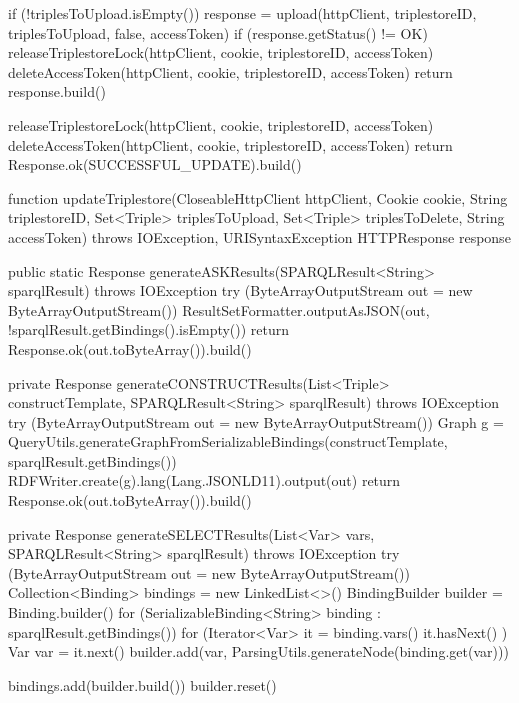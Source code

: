     if (!triplesToUpload.isEmpty()) 
        response = upload(httpClient, triplestoreID, triplesToUpload, false, accessToken)
        if (response.getStatus() != OK) 
            releaseTriplestoreLock(httpClient, cookie, triplestoreID, accessToken)
            deleteAccessToken(httpClient, cookie, triplestoreID, accessToken)
            return response.build()
        
    
    releaseTriplestoreLock(httpClient, cookie, triplestoreID, accessToken)
    deleteAccessToken(httpClient, cookie, triplestoreID, accessToken)
    return Response.ok(SUCCESSFUL_UPDATE).build()


function updateTriplestore(CloseableHttpClient httpClient, Cookie cookie, String triplestoreID,
                                    Set<Triple> triplesToUpload, Set<Triple> triplesToDelete, String accessToken) throws IOException, URISyntaxException 
    HTTPResponse response
    


public static Response generateASKResults(SPARQLResult<String> sparqlResult) throws IOException 
    try (ByteArrayOutputStream out = new ByteArrayOutputStream()) 
        ResultSetFormatter.outputAsJSON(out, !sparqlResult.getBindings().isEmpty())
        return Response.ok(out.toByteArray()).build()
    


private Response generateCONSTRUCTResults(List<Triple> constructTemplate, SPARQLResult<String> sparqlResult) throws IOException 
    try (ByteArrayOutputStream out = new ByteArrayOutputStream()) 
        Graph g = QueryUtils.generateGraphFromSerializableBindings(constructTemplate, sparqlResult.getBindings())
        RDFWriter.create(g).lang(Lang.JSONLD11).output(out)
        return Response.ok(out.toByteArray()).build()
    


private Response generateSELECTResults(List<Var> vars, SPARQLResult<String> sparqlResult) throws IOException 
    try (ByteArrayOutputStream out = new ByteArrayOutputStream()) 
        Collection<Binding> bindings = new LinkedList<>()
        BindingBuilder builder = Binding.builder()
        for (SerializableBinding<String> binding : sparqlResult.getBindings()) 
            for (Iterator<Var> it = binding.vars() it.hasNext() ) 
                Var var = it.next()
                builder.add(var, ParsingUtils.generateNode(binding.get(var)))
            
            bindings.add(builder.build())
            builder.reset()
        
